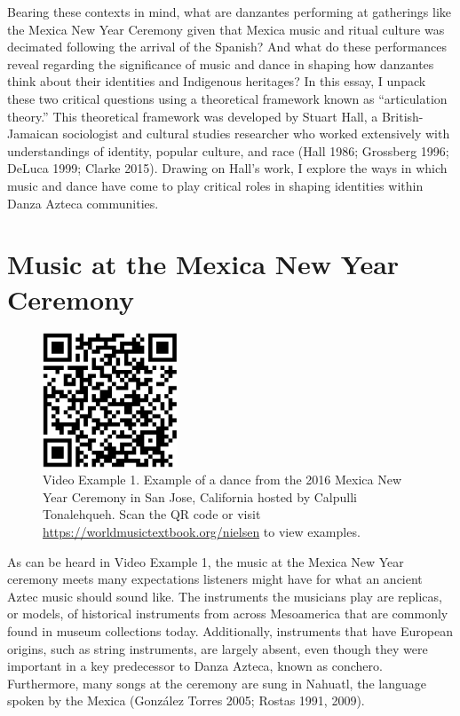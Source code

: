 \documentclass[twoside]{article}
\providecommand{\wmturl}{\href{https://worldmusictextbook.org/nielsen}{https://worldmusictextbook.org/nielsen}}
\providecommand{\wmturlcaption}{
  Scan the QR code or visit \wmturl{} to view examples.
}
\begin{document}
Bearing these contexts in mind, what are danzantes performing at
gatherings like the Mexica New Year Ceremony given that Mexica music and
ritual culture was decimated following the arrival of the Spanish? And
what do these performances reveal regarding the significance of music
and dance in shaping how danzantes think about their identities and
Indigenous heritages? In this essay, I unpack these two critical
questions using a theoretical framework known as ``articulation
theory.'' This theoretical framework was developed by Stuart Hall, a
British-Jamaican sociologist and cultural studies researcher who worked
extensively with understandings of identity, popular culture, and race
(Hall 1986; Grossberg 1996; DeLuca 1999; Clarke 2015). Drawing on Hall's
work, I explore the ways in which music and dance have come to play
critical roles in shaping identities within Danza Azteca communities.

\hypertarget{music-at-the-mexica-new-year-ceremony}{%
\section*{Music at the Mexica New Year
Ceremony}\label{music-at-the-mexica-new-year-ceremony}}

\begin{figure}
  \centering
  \includegraphics[height=4cm]{nielsen-video-1.png}
  \caption*{Video Example 1. Example of a dance from the 2016 Mexica New Year
  Ceremony in San Jose, California hosted by Calpulli Tonalehqueh. \wmturlcaption}
\end{figure}

As can be heard in Video Example 1, the music at the Mexica New Year
ceremony meets many expectations listeners might have for what an
ancient Aztec music should sound like. The instruments the musicians
play are replicas, or models, of historical instruments from across
Mesoamerica that are commonly found in museum collections today.
Additionally, instruments that have European origins, such as string
instruments, are largely absent, even though they were important in a
key predecessor to Danza Azteca, known as conchero. Furthermore, many
songs at the ceremony are sung in Nahuatl, the language spoken by the
Mexica (González Torres 2005; Rostas 1991, 2009).
\end{document}
